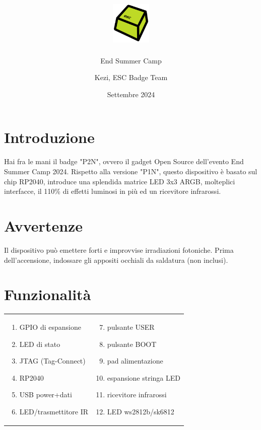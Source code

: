 \documentclass[10pt]{datasheet}
\title{\includegraphics[height=2cm]{logo} \raisebox{1\height}{Hardware mini-badge "P2N"}}
\author{End Summer Camp}
\date{Settembre 2024}
\author{Kezi, ESC Badge Team}
\begin{document}
	\maketitle
	
	\section{Introduzione}
	Hai fra le mani il badge "P2N", ovvero il gadget Open Source dell'evento End Summer Camp 2024.
	Rispetto alla versione "P1N", questo dispositivo è basato sul chip RP2040, introduce una splendida matrice LED 3x3 ARGB, molteplici interfacce,
	il 110\% di effetti luminosi in più ed un ricevitore infrarossi.
	
	\section{Avvertenze}
	Il dispositivo può emettere forti e improvvise irradiazioni fotoniche.
	Prima dell'accensione, indossare gli appositi occhiali da saldatura
	(non inclusi).
	
	\section{Funzionalità}
	\begin{tabular}{l l}
		  \begin{minipage}{1.45in}

				\begin{enumerate}[itemsep=1pt]
				\item{GPIO di espansione}
				\item{LED di stato}
				\item{JTAG (Tag-Connect)}
				\item{RP2040}
				\item{USB power+dati}
				\item{LED/trasmettitore IR}

			\end{enumerate} 
			
			\end{minipage}&
				  \begin{minipage}{2in}

			\begin{enumerate}[itemsep=1pt]
			\setcounter{enumi}{6}
			\item{pulsante USER}
			\item{pulsante BOOT}
			\item{pad alimentazione}
			\item{espansione stringa LED}
			\item{ricevitore infrarossi}
			\item LED ws2812b/sk6812
			\end{enumerate} 
			
		\end{minipage}
	\end{tabular}
\end{document}
